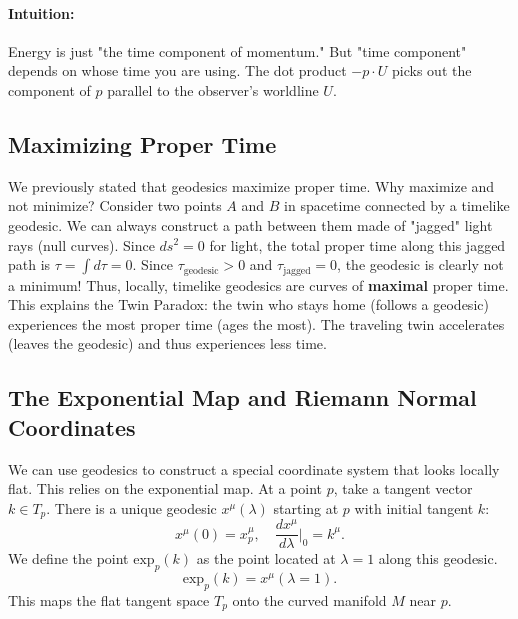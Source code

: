 \documentclass[11pt, a4paper]{report}
\begin{document}
\paragraph{Intuition:} Energy is just "the time component of momentum." But "time component" depends on whose time you are using. The dot product \(-p \cdot U\) picks out the component of \(p\) parallel to the observer's worldline \(U\).

\subsection*{Maximizing Proper Time}
We previously stated that geodesics maximize proper time. Why maximize and not minimize?
Consider two points \(A\) and \(B\) in spacetime connected by a timelike geodesic.
We can always construct a path between them made of "jagged" light rays (null curves).
Since \(ds^2 = 0\) for light, the total proper time along this jagged path is \(\tau = \int d\tau = 0\).
Since \(\tau_{\text{geodesic}} > 0\) and \(\tau_{\text{jagged}} = 0\), the geodesic is clearly not a minimum!
Thus, locally, timelike geodesics are curves of \textbf{maximal} proper time. This explains the Twin Paradox: the twin who stays home (follows a geodesic) experiences the most proper time (ages the most). The traveling twin accelerates (leaves the geodesic) and thus experiences less time.

\subsection*{The Exponential Map and Riemann Normal Coordinates}
We can use geodesics to construct a special coordinate system that looks locally flat. This relies on the exponential map.
At a point \(p\), take a tangent vector \(k \in T_p\). There is a unique geodesic \(x^\mu(\lambda)\) starting at \(p\) with initial tangent \(k\):
\begin{equation}
x^\mu(0) = x^\mu_p, \quad \frac{dx^\mu}{d\lambda}\bigg|_0 = k^\mu.
\end{equation}
We define the point \(\text{exp}_p(k)\) as the point located at \(\lambda=1\) along this geodesic.
\begin{equation}
\text{exp}_p(k) = x^\mu(\lambda=1).
\end{equation}
This maps the flat tangent space \(T_p\) onto the curved manifold \(M\) near \(p\).
\end{document}
